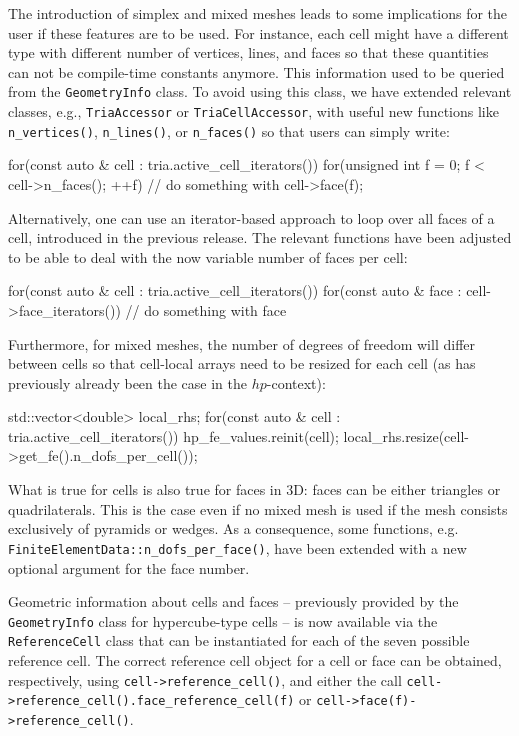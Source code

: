 \documentclass{ansarticle-preprint}
\begin{document}
The introduction of simplex and mixed meshes leads to some implications
for the user if these features are to be used. For instance, each cell might have a different type with
different number of vertices, lines, and faces so that these quantities can not be
compile-time constants anymore. This information used to be queried from
the \texttt{GeometryInfo} class. To avoid using this class, we have extended
relevant classes, e.g., \texttt{TriaAccessor} or \texttt{TriaCellAccessor},
with useful new functions like \texttt{n\_vertices()}, \texttt{n\_lines()}, or
\texttt{n\_faces()} so that users can simply write:
\begin{c++}
for(const auto & cell : tria.active_cell_iterators())
  for(unsigned int f = 0; f < cell->n_faces(); ++f)
    // do something with cell->face(f);
\end{c++}
Alternatively, one can use an iterator-based approach to loop over all faces
of a cell, introduced in the previous release. The relevant functions have been adjusted to be able to deal with
the now variable number of faces per cell:
\begin{c++}
for(const auto & cell : tria.active_cell_iterators())
  for(const auto & face : cell->face_iterators())
    // do something with face
\end{c++}
Furthermore, for mixed meshes, the number of degrees of freedom will differ between cells so that
cell-local arrays need to be resized for each
cell (as has previously already been the case in the $hp$-context):
\begin{c++}
std::vector<double> local_rhs;
for(const auto & cell : tria.active_cell_iterators())
 {
   hp_fe_values.reinit(cell);
   local_rhs.resize(cell->get_fe().n_dofs_per_cell());
 }
\end{c++}


What is true for cells is also true for faces in 3D: faces can be either triangles
or quadrilaterals. This is the case even if no mixed mesh is used if
the mesh consists exclusively of pyramids or wedges. As a consequence, some functions, e.g. \texttt{FiniteElementData::n\_dofs\_per\_face()}, have been extended with a new optional argument for the face number.

Geometric information about cells and faces -- previously provided by
the \texttt{GeometryInfo} class for hypercube-type cells -- is now
available via the  \texttt{ReferenceCell} class that can be
instantiated for each of the seven possible reference cell. The
correct reference cell object for a cell or face can be obtained, respectively, using
\texttt{cell->reference\_cell()}, and either the call
\texttt{cell->reference\_cell().face\_reference\_cell(f)}
or
\texttt{cell->face(f)->reference\_cell()}.
\end{document}
